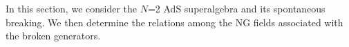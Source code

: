 \documentclass[a4paper,12pt]{article}
\begin{document}
\vspace{0.3cm}
\vspace{0.3cm}

In this section, we consider the $N$=2 AdS superalgebra and its
spontaneous breaking. We then determine the relations among the NG
fields associated with the broken generators.

\vspace{0.1cm}
\vspace{0.1cm}
\end{document}
